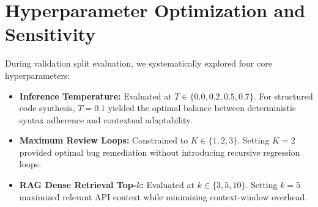 \section{Hyperparameter Optimization and Sensitivity}
During validation split evaluation, we systematically explored four core hyperparameters:
\begin{itemize}
    \item \textbf{Inference Temperature:} Evaluated at $T \in \{0.0, 0.2, 0.5, 0.7\}$. For structured code synthesis, $T=0.1$ yielded the optimal balance between deterministic syntax adherence and contextual adaptability.
    \item \textbf{Maximum Review Loops:} Constrained to $K \in \{1, 2, 3\}$. Setting $K=2$ provided optimal bug remediation without introducing recursive regression loops.
    \item \textbf{RAG Dense Retrieval Top-$k$:} Evaluated at $k \in \{3, 5, 10\}$. Setting $k=5$ maximized relevant API context while minimizing context-window overhead.
\end{itemize}
